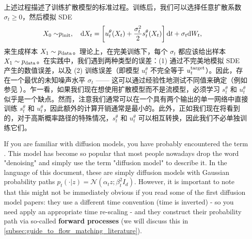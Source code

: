 上述过程描述了训练扩散模型的标准过程。训练后，我们可以选择任意扩散系数 $\sigma_t\geq 0$，然后模拟 SDE
\begin{align}
\label{eq:sde_extension_restated}
    X_0\sim&p_{\rm{init}},\quad \mathrm{d} X_t =\left[u_t^\theta(X_t)+\frac{\sigma_t^2}{2}s_t^\theta(X_t)\right]\mathrm{d} t +\sigma_t\mathrm{d} W_t,
\end{align}
来生成样本 $X_1\sim p_{\rm{data}}$。理论上，在完美训练下，每个 $\sigma_t$ 都应该给出样本 $X_1\sim p_{\rm{data}}$。在实践中，我们遇到两种类型的误差：(1) 通过不完美地模拟 SDE 产生的数值误差，以及 (2) 训练误差（即模型 $u_t^{\theta}$ 不完全等于 $u^{\text{target}}_t$）。因此，存在一个最优的未知噪声水平 $\sigma_t$ —— 这可以通过经验性地测试不同值来确定（例如参见 \citep{albergo2023stochastic,karras2022elucidating,ma2024sit}）。乍一看，如果我们现在想使用扩散模型而不是流模型，必须学习 $s_t^\theta$ 和 $u_t^\theta$ 似乎是一个缺点。然而，注意我们通常可以在一个具有两个输出的单一网络中直接训练 $s_t^\theta$ 和 $u_t^\theta$，因此额外的计算开销通常是最小的。此外，正如我们现在将看到的，对于高斯概率路径的特殊情况，$s_t^\theta$ 和 $u_t^\theta$ 可以相互转换，因此我们不必单独训练它们。

\begin{remarkbox}If you are familiar with diffusion models, you have probably encountered the term . This model has become so popular that most people nowadays drop the word "denoising" and simply use the term "diffusion model" to describe it. In the language of this document, these are simply diffusion models with Gaussian probability paths $p_t(\cdot|z)=\mathcal{N}(\alpha_t z;\beta_t^2 I_d)$. However, it is important to note that this might not be immediately obvious if you read some of the first diffusion model papers: they use a different time convention (time is inverted) - so you need apply an appropriate time re-scaling - and they construct their probability path via so-called \textbf{forward processes} (we will discuss this in \cref{subsec:guide_to_flow_matching_literature}).
\end{remarkbox}

